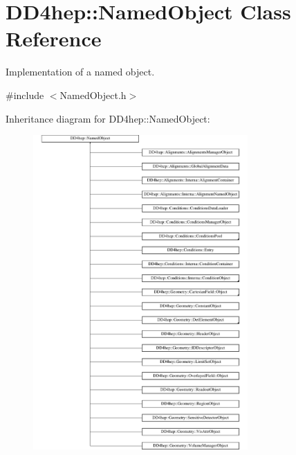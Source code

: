 \hypertarget{class_d_d4hep_1_1_named_object}{}\section{D\+D4hep\+:\+:Named\+Object Class Reference}
\label{class_d_d4hep_1_1_named_object}


Implementation of a named object.  




{\ttfamily \#include $<$Named\+Object.\+h$>$}

Inheritance diagram for D\+D4hep\+:\+:Named\+Object\+:\begin{figure}[H]
\begin{center}
\leavevmode
\includegraphics[height=12.000000cm]{class_d_d4hep_1_1_named_object}
\end{center}
\end{figure}
